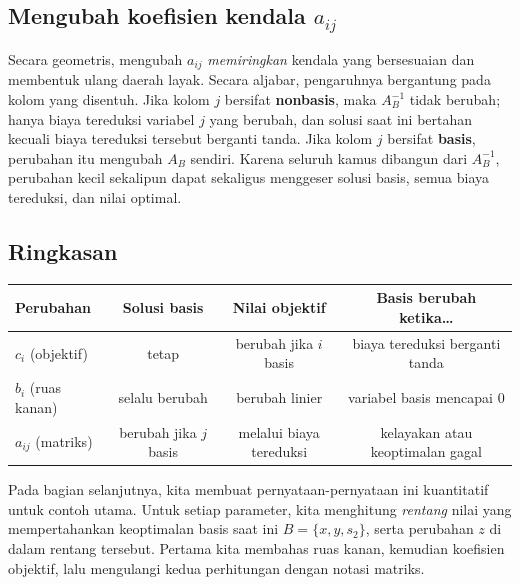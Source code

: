 \subsection{Mengubah koefisien kendala \( a_{ij} \)}

Secara geometris, mengubah \(a_{ij}\) \emph{memiringkan} kendala yang bersesuaian dan membentuk ulang daerah layak. Secara aljabar, pengaruhnya bergantung pada kolom yang disentuh. Jika kolom \(j\) bersifat \textbf{nonbasis}, maka \(A_B^{-1}\) tidak berubah; hanya biaya tereduksi variabel \(j\) yang berubah, dan solusi saat ini bertahan kecuali biaya tereduksi tersebut berganti tanda. Jika kolom \(j\) bersifat \textbf{basis}, perubahan itu mengubah \(A_B\) sendiri. Karena seluruh kamus dibangun dari \(A_B^{-1}\), perubahan kecil sekalipun dapat sekaligus menggeser solusi basis, semua biaya tereduksi, dan nilai optimal.

\subsection{Ringkasan}

\begin{center}
\renewcommand{\arraystretch}{1.3}
\begin{tabular}{@{}lccc@{}}
\toprule
Perubahan & Solusi basis & Nilai objektif & Basis berubah ketika\ldots\\
\midrule
$c_i$ (objektif) & tetap & berubah jika $i$ basis & biaya tereduksi berganti tanda\\
$b_i$ (ruas kanan) & selalu berubah & berubah linier & variabel basis mencapai $0$\\
$a_{ij}$ (matriks) & berubah jika $j$ basis & melalui biaya tereduksi & kelayakan atau keoptimalan gagal\\
\bottomrule
\end{tabular}
\par{}\label{tab:sensitivity-LP-tab01}%

\end{center}

Pada bagian selanjutnya, kita membuat pernyataan-pernyataan ini kuantitatif untuk contoh utama. Untuk setiap parameter, kita menghitung \emph{rentang} nilai yang mempertahankan keoptimalan basis saat ini \( B = \{x,y,s_2\} \), serta perubahan \(z\) di dalam rentang tersebut. Pertama kita membahas ruas kanan, kemudian koefisien objektif, lalu mengulangi kedua perhitungan dengan notasi matriks.


